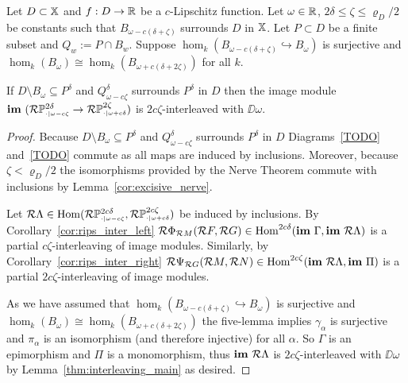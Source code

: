 \begin{theorem}
  Let $D\subset\mathbb{X}$ and $f : D\to\mathbb{R}$ be a $c$-Lipschitz function.
  Let $\omega\in\mathbb{R}$, $2\delta\leq\zeta\leq\varrho_D/2$ be constants such that $B_{\omega-c(\delta+\zeta)}$ surrounds $D$ in $\mathbb{X}$.
  Let $P\subset D$ be a finite subset and $Q_w := P\cap B_w$.
  Suppose $\hom_k(B_{\omega-c(\delta+\zeta)}\hookrightarrow B_\omega)$ is surjective and $\hom_k(B_\omega)\cong\hom_k(B_{\omega+c(\delta+2\zeta)})$ for all $k$.

  If $D\setminus B_\omega\subseteq P^\delta$ and $Q_{\omega-c\zeta}^\delta$ surrounds $P^\delta$ in $D$ then the image module $\mathbf{im}~(\mathcal{R}\mathbb{P}_{\scriptscriptstyle \cdot\mid \omega-c\zeta}^{2\delta}\to \mathcal{R}\mathbb{P}_{\scriptscriptstyle \cdot\mid \omega+c\delta}^{2\zeta})$ is $2c\zeta$-interleaved with $\DD{\omega}$.
\end{theorem}
\begin{proof}
  Because $D\setminus B_\omega\subseteq P^\delta$ and $Q_{\omega-c\zeta}^\delta$ surrounds $P^\delta$ in $D$ Diagrams~\ref{TODO} and~\ref{TODO} commute as all maps are induced by inclusions.
  Moreover, because $\zeta < \varrho_D/2$ the isomorphisms provided by the Nerve Theorem commute with inclusions by Lemma~\ref{cor:excisive_nerve}.

  Let $\mathcal{R}\Lambda \in\mathrm{Hom}(\mathcal{R}\mathbb{P}_{\scriptscriptstyle \cdot\mid \omega-c\zeta}^{2c\delta}, \mathcal{R}\mathbb{P}_{\scriptscriptstyle \cdot\mid \omega+c\delta}^{2c\zeta})$ be induced by inclusions.
  By Corollary~\ref{cor:rips_inter_left} $\mathcal{R} \Phi_{\mathcal{R} M}(\mathcal{R} F, \mathcal{R} G)\in\mathrm{Hom}^{2c\delta}(\mathbf{im}~\Gamma,\mathbf{im}~\mathcal{R}\Lambda)$ is a partial $c\zeta$-interleaving of image modules.
  Similarly, by Corollary~\ref{cor:rips_inter_right} $\mathcal{R} \Psi_{\mathcal{R} G} (\mathcal{R} M,\mathcal{R} N)\in\mathrm{Hom}^{2c\zeta}(\mathbf{im}~\mathcal{R}\Lambda, \mathbf{im}~\Pi)$ is a partial $2c\zeta$-interleaving of image modules.

  As we have assumed that $\hom_k(B_{\omega-c(\delta+\zeta)}\hookrightarrow B_\omega)$ is surjective and $\hom_k(B_\omega)\cong\hom_k(B_{\omega+c(\delta+2\zeta)})$ the five-lemma implies $\gamma_\alpha$ is surjective and $\pi_\alpha$ is an isomorphism (and therefore injective) for all $\alpha$.
  So $\Gamma$ is an epimorphism and $\Pi$ is a monomorphism, thus $\mathbf{im}~\mathcal{R}\Lambda$ is $2c\zeta$-interleaved with $\DD{\omega}$ by Lemma~\ref{thm:interleaving_main} as desired.
\end{proof}

